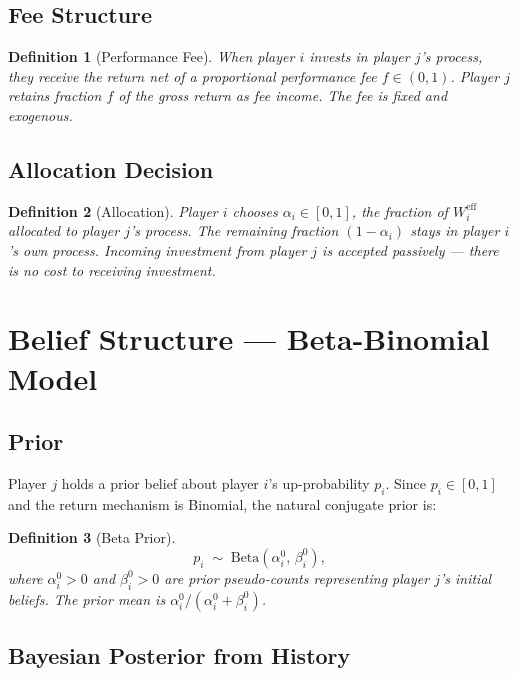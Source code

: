 \documentclass[12pt,a4paper]{article}
\newtheorem{definition}{Definition}[section]
\newcommand{\1}{\mathbf{1}}
\begin{document}
\subsection{Fee Structure}

\begin{definition}[Performance Fee]
When player $i$ invests in player $j$'s process, they receive the return net of a proportional performance fee $f \in (0,1)$. Player $j$ retains fraction $f$ of the gross return as fee income. The fee is fixed and exogenous.
\end{definition}

\subsection{Allocation Decision}

\begin{definition}[Allocation]
Player $i$ chooses $\alpha_i \in [0,1]$, the fraction of $W_i^{\mathrm{eff}}$ allocated to player $j$'s process. The remaining fraction $(1 - \alpha_i)$ stays in player $i$'s own process. Incoming investment from player $j$ is accepted passively — there is no cost to receiving investment.
\end{definition}

\section{Belief Structure — Beta-Binomial Model}

\subsection{Prior}

Player $j$ holds a prior belief about player $i$'s up-probability $p_i$. Since $p_i \in [0,1]$ and the return mechanism is Binomial, the natural conjugate prior is:

\begin{definition}[Beta Prior]
\[
  p_i \;\sim\; \mathrm{Beta}(\alpha_i^0,\, \beta_i^0),
\]
where $\alpha_i^0 > 0$ and $\beta_i^0 > 0$ are prior pseudo-counts representing player $j$'s initial beliefs. The prior mean is $\alpha_i^0 / (\alpha_i^0 + \beta_i^0)$.
\end{definition}

\subsection{Bayesian Posterior from History}
\end{document}
